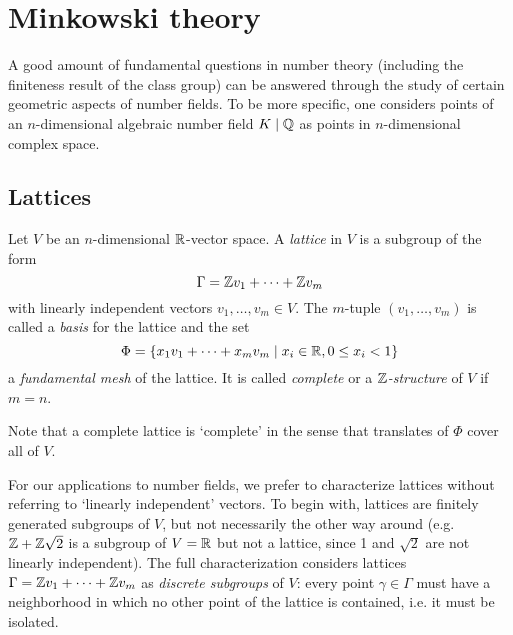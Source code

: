 \section{Minkowski theory}

A good amount of fundamental questions in number theory (including the finiteness result of the class group) can be answered through the study of certain geometric aspects of number fields. To be more specific, one considers points of an $n$-dimensional algebraic number field $K\mid\mathbb{Q}$ as points in $n$-dimensional complex space.

\subsection{Lattices}

\begin{definition}
	Let $V$ be an $n$-dimensional $\mathbb{R}$-vector space. A \emph{lattice} in $V$ is a subgroup of the form
	\[
		\Gamma = \mathbb{Z} v_1 + \cdots + \mathbb{Z} v_m
	\]
	with linearly independent vectors $v_1,\dots,v_m\in V$. The $m$-tuple $(v_1,\dots,v_m)$ is called a \emph{basis} for the lattice and the set
	\[
		\Phi = \{x_1v_1 + \cdots + x_mv_m \mid x_i\in\mathbb{R}, 0\leq x_i< 1\}
	\]
	a \emph{fundamental mesh} of the lattice. It is called \emph{complete} or a \emph{$\mathbb{Z}$-structure} of $V$ if $m=n$.
\end{definition}

Note that a complete lattice is `complete' in the sense that translates of $\Phi$ cover all of $V$.

For our applications to number fields, we prefer to characterize lattices without referring to `linearly independent' vectors. To begin with, lattices are finitely generated subgroups of $V$, but not necessarily the other way around (e.g. $\mathbb{Z}+\mathbb{Z}\sqrt{2}$ is a subgroup of $V=\mathbb{R}$ but not a lattice, since 1 and $\sqrt{2}$ are not linearly independent). The full characterization considers lattices $\Gamma=\mathbb{Z} v_1 + \cdots + \mathbb{Z} v_m$ as \emph{discrete subgroups} of $V$: every point $\gamma\in\Gamma$ must have a neighborhood in which no other point of the lattice is contained, i.e. it must be isolated.

